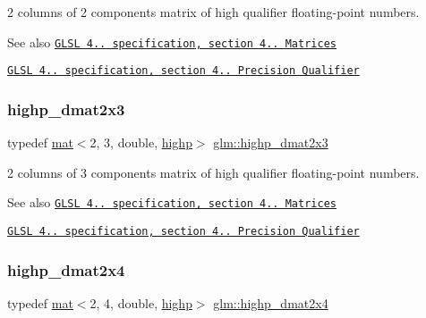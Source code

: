 2 columns of 2 components matrix of high qualifier floating-\/point numbers.

\begin{DoxySeeAlso}{See also}
\href{http://www.opengl.org/registry/doc/GLSLangSpec.4.20.8.pdf}{\tt G\+L\+SL 4.. specification, section 4.. Matrices} 

\href{http://www.opengl.org/registry/doc/GLSLangSpec.4.20.8.pdf}{\tt G\+L\+SL 4.. specification, section 4.. Precision Qualifier} 
\end{DoxySeeAlso}
\mbox{\label{group__core__precision_gad7de433cb7f79959a191fc5c64fbfc4e}} 
\subsubsection{\texorpdfstring{highp\+\_\+dmat2x3}{highp\_dmat2x3}}
{\footnotesize\ttfamily typedef \mbox{\hyperlink{structglm_1_1mat}{mat}}$<$2, 3, double, \mbox{\hyperlink{namespaceglm_a36ed105b07c7746804d7fdc7cc90ff25ac6f7eab42eacbb10d59a58e95e362074}{highp}}$>$ \mbox{\hyperlink{group__core__precision_gad7de433cb7f79959a191fc5c64fbfc4e}{glm\+::highp\+\_\+dmat2x3}}}

2 columns of 3 components matrix of high qualifier floating-\/point numbers.

\begin{DoxySeeAlso}{See also}
\href{http://www.opengl.org/registry/doc/GLSLangSpec.4.20.8.pdf}{\tt G\+L\+SL 4.. specification, section 4.. Matrices} 

\href{http://www.opengl.org/registry/doc/GLSLangSpec.4.20.8.pdf}{\tt G\+L\+SL 4.. specification, section 4.. Precision Qualifier} 
\end{DoxySeeAlso}
\mbox{\label{group__core__precision_gaea7c625705d849f1a55c9bfcb2585875}} 
\subsubsection{\texorpdfstring{highp\+\_\+dmat2x4}{highp\_dmat2x4}}
{\footnotesize\ttfamily typedef \mbox{\hyperlink{structglm_1_1mat}{mat}}$<$2, 4, double, \mbox{\hyperlink{namespaceglm_a36ed105b07c7746804d7fdc7cc90ff25ac6f7eab42eacbb10d59a58e95e362074}{highp}}$>$ \mbox{\hyperlink{group__core__precision_gaea7c625705d849f1a55c9bfcb2585875}{glm\+::highp\+\_\+dmat2x4}}}

